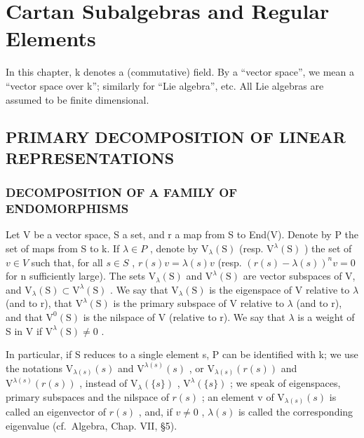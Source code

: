 \chapter{Cartan Subalgebras and Regular Elements}

In this chapter, k denotes a (commutative) field. By a ``vector space'', we mean a ``vector space over k''; similarly for ``Lie algebra'', etc. All Lie algebras are assumed to be finite dimensional.

\section{PRIMARY DECOMPOSITION OF LINEAR REPRESENTATIONS}

\subsection{DECOMPOSITION OF A FAMILY OF ENDOMORPHISMS}

Let V be a vector space, S a set, and r a map from S to End(V). Denote by P the set of maps from S to k. If \(\lambda \in P\) , denote by \(\mathrm{V}_{\lambda}(\mathrm{S})\) (resp. \(\mathrm{V}^{\lambda}(\mathrm{S})\) ) the set of \(v \in V\) such that, for all \(s \in S\) , \(r(s)v = \lambda(s)v\) (resp. \((r(s) - \lambda(s))^{n}v = 0\) for n sufficiently large). The sets \(\mathrm{V}_{\lambda}(\mathrm{S})\) and \(\mathrm{V}^{\lambda}(\mathrm{S})\) are vector subspaces of V, and \(\mathrm{V}_{\lambda}(\mathrm{S}) \subset \mathrm{V}^{\lambda}(\mathrm{S})\) . We say that \(\mathrm{V}_{\lambda}(\mathrm{S})\) is the eigenspace of V relative to \(\lambda\) (and to r), that \(\mathrm{V}^{\lambda}(\mathrm{S})\) is the primary subspace of V relative to \(\lambda\) (and to r), and that \(\mathrm{V}^{0}(\mathrm{S})\) is the nilspace of V (relative to r). We say that \(\lambda\) is a weight of S in V if \(\mathrm{V}^{\lambda}(\mathrm{S}) \neq 0\) .

In particular, if S reduces to a single element s, P can be identified with k; we use the notations \(\mathrm{V}_{\lambda(s)}(s)\) and \(\mathrm{V}^{\lambda(s)}(s)\) , or \(\mathrm{V}_{\lambda(s)}(r(s))\) and \(\mathrm{V}^{\lambda(s)}(r(s))\) , instead of \(\mathrm{V}_{\lambda}(\{s\})\) , \(\mathrm{V}^{\lambda}(\{s\})\) ; we speak of eigenspaces, primary subspaces and the nilspace of \(r(s)\) ; an element v of \(\mathrm{V}_{\lambda(s)}(s)\) is called an eigenvector of \(r(s)\) , and, if \(v \neq 0\) , \(\lambda(s)\) is called the corresponding eigenvalue (cf.~Algebra, Chap. VII, §5).

